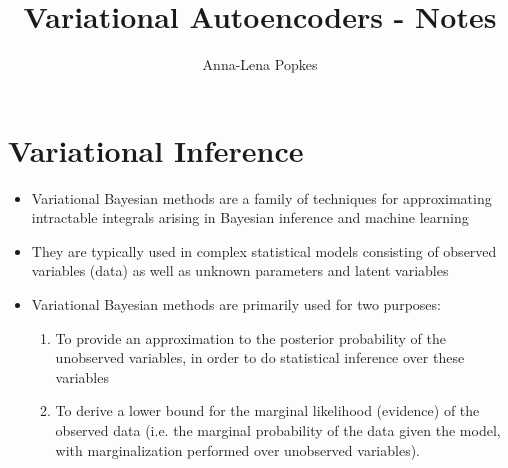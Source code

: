 \documentclass[]{article}
\title{Variational Autoencoders - Notes}
\author{Anna-Lena Popkes}
\begin{document}
\maketitle

\section{Variational Inference}
\label{sec:variational_inference}

\begin{itemize}
    \item Variational Bayesian methods are a family of techniques for approximating intractable integrals arising in Bayesian inference and machine learning
    \item They are typically used in complex statistical models consisting of observed variables (data) as well as unknown parameters and latent variables
        \item Variational Bayesian methods are primarily used for two purposes:
        \begin{enumerate}
        	\item To provide an approximation to the posterior probability of the unobserved variables, in order to do statistical inference over these variables
        	\item To derive a lower bound for the marginal likelihood (evidence) of the observed data (i.e. the marginal probability of the data given the model, with marginalization performed over unobserved variables). 
        	

\end{enumerate}
\end{itemize}
\end{document}
